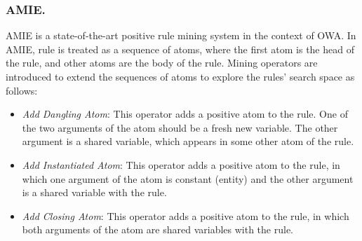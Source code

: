 \subsubsection{AMIE.}
AMIE \cite{amie} is a state-of-the-art positive rule mining system in the context of OWA. 
In AMIE, rule is treated as a sequence of atoms, where the first atom is the head of the rule, and other atoms are the body of the rule. Mining operators are introduced to extend the sequences of atoms to explore the rules' search space as follows:
\begin{itemize}
\item \textit{Add Dangling Atom}: This operator adds a positive atom to the rule. One of the two arguments of the atom should be a fresh new variable. The other argument is a shared variable, which appears in some other atom of the rule.
\item \textit{Add Instantiated Atom}: This operator adds a positive atom to the rule, in which one argument of the atom is constant (entity) and the other argument is a shared variable with the rule.
\item \textit{Add Closing Atom}: This operator adds a positive atom to the rule, in which both arguments of the atom are shared variables with the rule.
\end{itemize}

